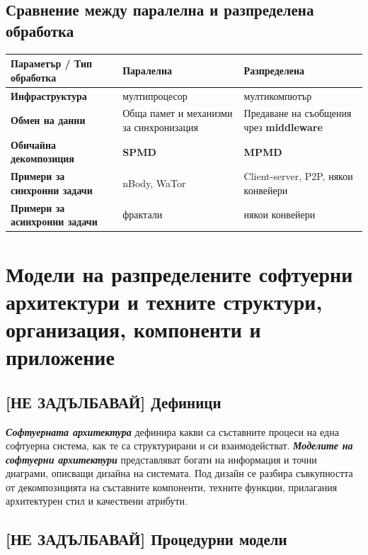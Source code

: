 \documentclass[fleqn,12pt]{article}
\begin{document}
\subsection{Сравнение между паралелна и разпределена обработка}
\begin{center}
    \begin{tabular}{ | m{60mm} | m{60mm}| m{60mm} | } 
    \hline
    \textbf{Параметър / Тип обработка} & \textbf{Паралелна} & \textbf{Разпределена} \\ 
    \hline
    \textbf{Инфраструктура} & мултипроцесор & мултикомпютър \\ 
    \hline
    \textbf{Обмен на данни} & Обща памет и механизми за синхронизация & Предаване на съобщения чрез \textbf{middleware} \\ 
    \hline
    \textbf{Обичайна декомпозиция} & \textbf{SPMD} & \textbf{MPMD} \\ 
    \hline
    \textbf{Примери за синхронни задачи} & nBody, WaTor & Client-server, P2P, някои конвейери \\ 
    \hline
    \textbf{Примери за асинхронни задачи} & фрактали & някои конвейери \\ 
    \hline
    \end{tabular}
\end{center}

\section{Модели на разпределените софтуерни архитектури и техните структури, организация, компоненти и приложение}

\subsection{[НЕ ЗАДЪЛБАВАЙ] Дефиници}
\textbf{\textit{Софтуерната архитектура}} дефинира какви са съставните процеси на една софтуерна система, как те са структурирани и си взаимодействат.
\textbf{\textit{Моделите на софтуерни архитектури}} представляват богати на информация и точни диаграми, описващи дизайна на системата.
Под дизайн се разбира съвкупността от декомпозицията на съставните компоненти, техните функции, прилагания архитектурен стил и качествени атрибути.

\subsection{[НЕ ЗАДЪЛБАВАЙ] Процедурни модели}
\end{document}
